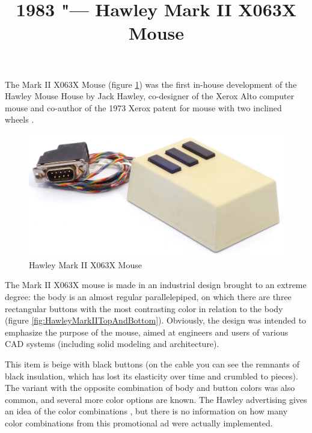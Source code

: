 \documentclass[11pt, a4paper]{article}
\begin{document}
\title{1983 "--- Hawley Mark II X063X Mouse}
\date{}
\maketitle

The Mark II X063X Mouse (figure \ref{fig:HawleyMarkIIPic}) was the first in-house development of the Hawley Mouse House \cite{hawley,mouses} by Jack Hawley, co-designer of the Xerox Alto computer mouse and co-author of the 1973 Xerox patent for mouse with two inclined wheels \cite{pat}.

\begin{figure}[h]
   \centering
    \includegraphics[scale=0.6]{1983_hawley_mark_ii/pic_60.jpg}
    \caption{Hawley Mark II X063X Mouse}
    \label{fig:HawleyMarkIIPic}
\end{figure}

The Mark II X063X mouse is made in an industrial design brought to an extreme degree: the body is an almost regular parallelepiped, on which there are three rectangular buttons with the most contrasting color in relation to the body (figure \ref{fig:HawleyMarkIITopAndBottom}). Obviously, the design was intended to emphasize the purpose of the mouse, aimed at engineers and users of various CAD systems (including solid modeling and architecture).

This item is beige with black buttons (on the cable you can see the remnants of black insulation, which has lost its elasticity over time and crumbled to pieces). The variant with the opposite combination of body and button colors was also common, and several more color options are known. The Hawley advertising gives an idea of the color combinations \cite{brochure}, but there is no information on how many color combinations from this promotional ad were actually implemented.
\end{document}
